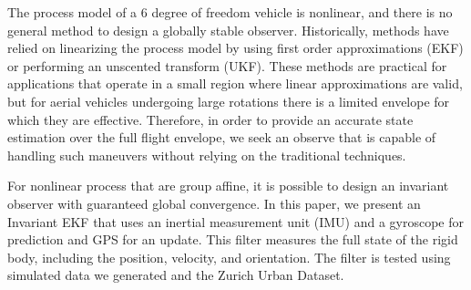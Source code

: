 The process model of a 6 degree of freedom vehicle is nonlinear, and there is no general method to design a globally stable observer.  Historically, methods have relied on linearizing the process model by using first order approximations (EKF) or performing an unscented transform (UKF)\cite{thrun2005probabilistic}.  These methods are practical for applications that operate in a small region where linear approximations are valid, but for aerial vehicles undergoing large rotations there is a limited envelope for which they are effective.  Therefore, in order to provide an accurate state estimation over the full flight envelope, we seek an observe that is capable of handling such maneuvers without relying on the traditional techniques. 

For nonlinear process that are group affine, it is possible to design an invariant observer with guaranteed global convergence\cite{InEKF_Barrau}. In this paper, we present an Invariant EKF that uses an inertial measurement unit (IMU) and a gyroscope for prediction and GPS for an update. This filter measures the full state of the rigid body, including the position, velocity, and orientation. The filter is tested using simulated data we generated and the Zurich Urban Dataset.